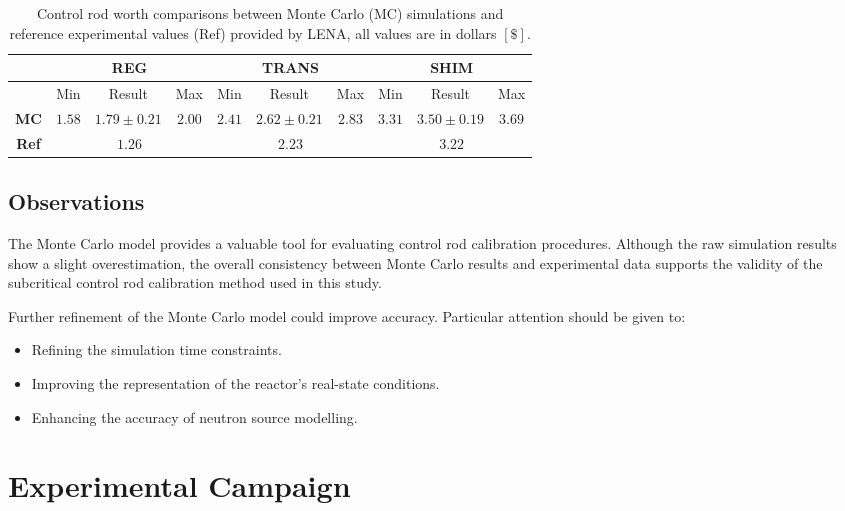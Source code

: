 \begin{table}[h]
    \centering
    \begin{tabular}{|c||c|c|c||c|c|c||c|c|c|}
        \hline
        \multicolumn{1}{|c||}{} & \multicolumn{3}{c||}{\textbf{REG}} & \multicolumn{3}{c||}{\textbf{TRANS}} & \multicolumn{3}{c|}{\textbf{SHIM}} \\
        \hline
        \multicolumn{1}{|c||}{} & Min & Result & Max & Min & Result & Max & Min & Result & Max \\
        \hline
        \textbf{MC} & $1.58$ & $1.79 \pm 0.21$ & $2.00$ 
        & $2.41$ & $2.62 \pm 0.21$ & $2.83$ 
        & $3.31$ & $3.50 \pm 0.19$ & $3.69$ \\
        \hline
        \textbf{Ref} & \multicolumn{3}{c||}{$1.26$} & \multicolumn{3}{c||}{$2.23$} & \multicolumn{3}{c|}{$3.22$} \\
        \hline
    \end{tabular}
    \caption{Control rod worth comparisons between Monte Carlo (MC) simulations and reference experimental values (Ref) provided by LENA, all values are in dollars $\left[ \$ \right]$.}
    \label{tab:cr_worth}
\end{table}

\subsection{Observations}

The Monte Carlo model provides a valuable tool for evaluating control rod calibration procedures. Although the raw simulation results show a slight overestimation, the overall consistency between Monte Carlo results and experimental data supports the validity of the subcritical control rod calibration method used in this study.

Further refinement of the Monte Carlo model could improve accuracy. Particular attention should be given to:

\begin{itemize}
    \item Refining the simulation time constraints.
    \item Improving the representation of the reactor’s real-state conditions.
    \item Enhancing the accuracy of neutron source modelling.
\end{itemize}
\section{Experimental Campaign}

